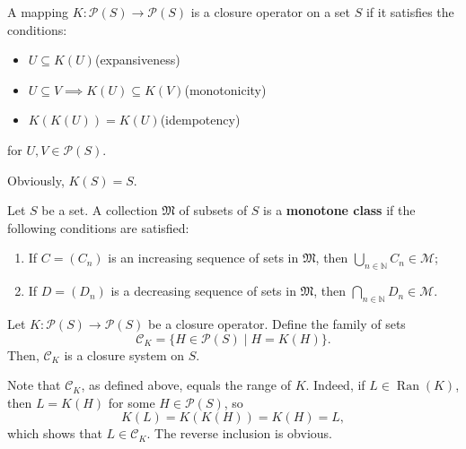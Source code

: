 \documentclass[../main.tex]{subfiles}
\begin{document}
\begin{purple}
\begin{definition}

A mapping $K:\mathcal{P}(S)\rightarrow\mathcal{P}(S)$ is a closure operator on a set $S$ if it satisfies the conditions:
\begin{itemize}
    \item $U\subseteq K(U)$(expansiveness)
    \item $U\subseteq V\implies K(U)\subseteq K(V)$(monotonicity)
    \item $K(K(U))=K(U)$(idempotency)
\end{itemize}
for $U,V\in\mathcal{P}(S)$.
\end{definition}
\end{purple}

Obviously, $K(S)=S$.

\begin{purple}
\begin{definition}
    Let $S$ be a set. A collection $\mathfrak{M}$ of subsets of $S$ is a \textbf{monotone class} if the following conditions are satisfied:
    \begin{enumerate}
        \item If $C = (C_n)$ is an increasing sequence of sets in $\mathfrak{M}$, then $\bigcup_{n \in \mathbb{N}} C_n \in \mathcal{M}$;
        
        \item If $D = (D_n)$ is a decreasing sequence of sets in $\mathfrak{M}$, then $\bigcap_{n \in \mathbb{N}} D_n \in \mathcal{M}$.
    \end{enumerate}
\end{definition}
\end{purple}

\begin{yellow}
\begin{theorem}

Let $K: \mathcal{P}(S) \to \mathcal{P}(S)$ be a closure operator. Define the family of sets 
$$
\mathcal{C}_K = \{H \in \mathcal{P}(S) \mid H = K(H)\}.
$$ 
Then, $\mathcal{C}_K$ is a closure system on $S$.

\end{theorem}
\end{yellow}

\begin{green}
    
Note that $\mathcal{C}_{K}$, as defined above, equals the range of $K$. Indeed, if $L \in \operatorname{Ran}(K)$, then $L = K(H)$ for some $H \in \mathcal{P}(S)$, so
$$
K(L) = K(K(H)) = K(H) = L,
$$
which shows that $L \in \mathcal{C}_{K}$. The reverse inclusion is obvious.

\end{green}
\end{document}

